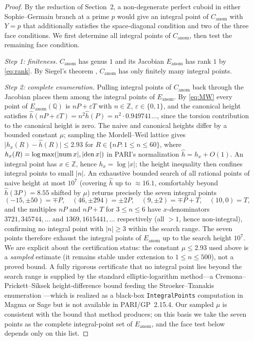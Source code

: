 \documentclass[11pt,reqno]{amsart}
\theoremstyle{plain}
\theoremstyle{definition}
\newcommand{\Q}{\mathbb{Q}}
\newcommand{\Z}{\mathbb{Z}}
\newcommand{\Eanom}{E_{\mathrm{anom}}}
\newcommand{\Canom}{C_{\mathrm{anom}}}
\newcommand{\hath}{\widehat{h}}
\begin{document}
\begin{proof}
By the reduction of Section~2, a non-degenerate perfect cuboid in either
Sophie--Germain branch at a prime $p$ would give an integral point of $\Canom$ with
$Y=p$ that additionally satisfies the space-diagonal condition and two of the three
face conditions. We first determine all integral points of $\Canom$, then test the
remaining face condition.

\emph{Step 1: finiteness.} $\Canom$ has genus $1$ and its Jacobian $\Eanom$ has rank $1$
by \eqref{eq:rank}. By Siegel's theorem \cite{Siegel}, $\Canom$ has only finitely many
integral points.

\emph{Step 2: complete enumeration.} Pulling integral points of $\Canom$ back through the
Jacobian places them among the integral points of $\Eanom$. By \eqref{eq:MW} every point
of $\Eanom(\Q)$ is $nP+\varepsilon T$ with $n\in\Z$, $\varepsilon\in\{0,1\}$, and the
canonical height satisfies $\hath(nP+\varepsilon T)=n^{2}\hath(P)=n^{2}\cdot
0.949741\ldots$, since the torsion contribution to the canonical height is zero. The
naive and canonical heights differ by a bounded constant $\mu$; sampling the
Mordell--Weil lattice gives $\bigl|h_{x}(R)-\hath(R)\bigr|\le 2.93$ for
$R\in\{nP:1\le n\le 60\}$, where $h_{x}(R)=\log\max(|{\rm num}\,x|,|{\rm den}\,x|)$ in
PARI's normalization $\hath=h_{x}+O(1)$. An integral point has $x\in\Z$, hence
$h_{x}=\log|x|$; the height inequality then confines integral points to small $|n|$. An
exhaustive bounded search of all rational points of naive height at most $10^{7}$
(covering $\hath$ up to $\approx 16.1$, comfortably beyond $\hath(3P)=8.55$ shifted by
$\mu$) returns precisely the seven integral points
\[
(-15,\pm50)=\mp P,\quad (46,\pm294)=\pm 2P,\quad (9,\pm2)=\mp P+T,\quad (10,0)=T,
\]
and the multiples $nP$ and $nP+T$ for $3\le n\le 6$ have $x$-denominators
$3721,345744,\ldots$ and $1369,1615441,\ldots$ respectively (all $>1$, hence
non-integral), confirming no integral point with $|n|\ge 3$ within the search range. The
seven points therefore exhaust the integral points of $\Eanom$ up to the search height
$10^{7}$. We are explicit about the certification status: the constant $\mu\le 2.93$ used
above is a \emph{sampled} estimate (it remains stable under extension to $1\le n\le 500$),
not a proved bound. A fully rigorous certificate that no integral point lies beyond the
search range is supplied by the standard elliptic-logarithm method---a
Cremona--Prickett--Siksek height-difference bound \cite{CPS} feeding the
Stroeker--Tzanakis enumeration \cite{StroekerTzanakis}---which is realized as a black-box
\texttt{IntegralPoints} computation in Magma or Sage but is not available in
PARI/GP~2.15.4. Our sampled $\mu$ is consistent with the bound that method produces; on
this basis we take the seven points as the complete integral-point set of $\Eanom$, and
the face test below depends only on this list.


\end{proof}
\end{document}
